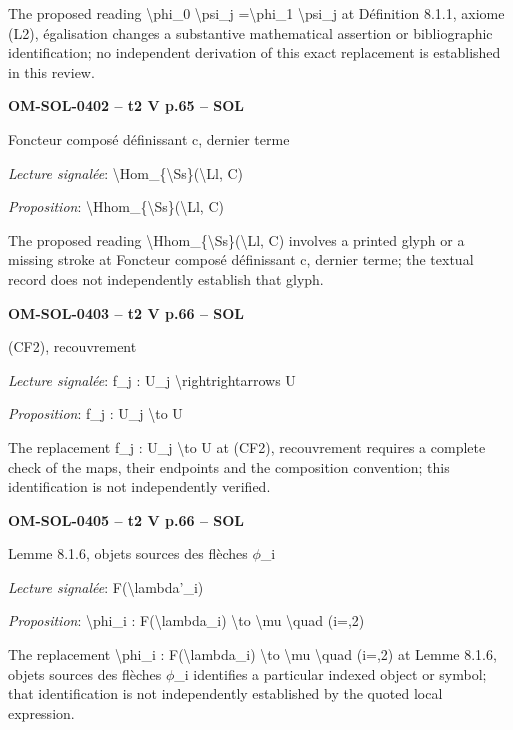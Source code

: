 The proposed reading \textbackslash{}phi\_0 \textbackslash{}psi\_j =\allowbreak  \textbackslash{}phi\_1 \textbackslash{}psi\_j at Définition 8.1.1, axiome (L2), égalisation changes a substantive mathematical assertion or bibliographic identification; no independent derivation of this exact replacement is established in this review.\par
\par\noindent\textbf{OM-SOL-0402 -- t2 V p.65 -- SOL}\par
Foncteur composé définissant c, dernier terme\par
\emph{Lecture signalée}: \textbackslash{}Hom\_\{\textbackslash{}Ss\}(\textbackslash{}Ll, C)\par
\emph{Proposition}: \textbackslash{}Hhom\_\{\textbackslash{}Ss\}(\textbackslash{}Ll, C)\par
The proposed reading \textbackslash{}Hhom\_\{\textbackslash{}Ss\}(\textbackslash{}Ll, C) involves a printed glyph or a missing stroke at Foncteur composé définissant c, dernier terme; the textual record does not independently establish that glyph.\par
\par\noindent\textbf{OM-SOL-0403 -- t2 V p.66 -- SOL}\par
(CF2), recouvrement\par
\emph{Lecture signalée}: f\_j : U\_j \textbackslash{}rightrightarrows U\par
\emph{Proposition}: f\_j : U\_j \textbackslash{}to U\par
The replacement f\_j : U\_j \textbackslash{}to U at (CF2), recouvrement requires a complete check of the maps, their endpoints and the composition convention; this identification is not independently verified.\par
\par\noindent\textbf{OM-SOL-0405 -- t2 V p.66 -- SOL}\par
Lemme 8.1.6, objets sources des flèches \ensuremath{\phi}\_i\par
\emph{Lecture signalée}: F(\textbackslash{}lambda'\_i)\par
\emph{Proposition}: \textbackslash{}phi\_i : F(\textbackslash{}lambda\_i) \textbackslash{}to \textbackslash{}mu \textbackslash{}quad (i=,2)\par
The replacement \textbackslash{}phi\_i : F(\textbackslash{}lambda\_i) \textbackslash{}to \textbackslash{}mu \textbackslash{}quad (i=,2) at Lemme 8.1.6, objets sources des flèches \ensuremath{\phi}\_i identifies a particular indexed object or symbol; that identification is not independently established by the quoted local expression.\par
